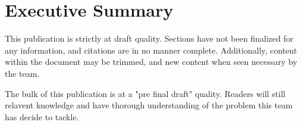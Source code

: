 \documentclass[../main.tex]{subfiles}
\begin{document}
\section{Executive Summary}\label{xSum}
This publication is strictly at draft quality. Sections have not been finalized for any information, and citations are in no manner complete. Additionally, content within the document may be trimmed, and new content when seen necessary by the team.\par

The bulk of this publication is at a "pre final draft" quality. Readers will still relavent knowledge and have thorough understanding of the problem this team has decide to tackle.\par
\end{document}
